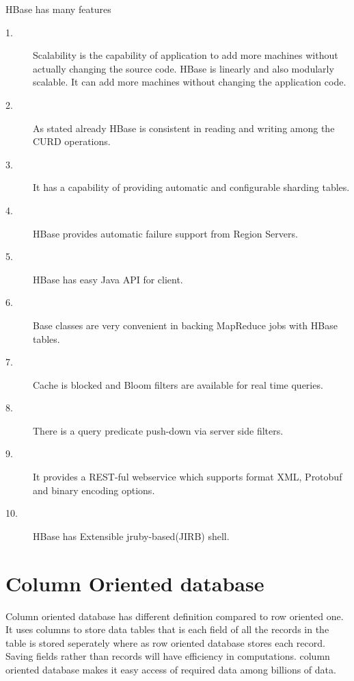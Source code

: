  HBase has many features~\cite{hid-sp18-421-HBase-feature}
 \begin{description}
  \item [1.] Scalability is the capability of application to add more machines 
  without actually changing the source code. HBase is linearly and also 
  modularly scalable. It can add more machines without changing the application 
  code.

 \item [2.] As stated already HBase is consistent in reading and writing among 
 the CURD operations.

 \item [3.] It has a capability of providing automatic and configurable sharding
 tables.

 \item [4.] HBase provides automatic failure support from Region Servers.

 \item [5.] HBase has easy Java API for client.

 \item [6.] Base classes are very convenient in backing MapReduce jobs with 
 HBase tables.

 \item [7.] Cache is blocked and Bloom filters are available for real time 
 queries.

 \item [8.] There is a query predicate push-down via server side filters.

 \item [9.] It provides a REST-ful webservice which supports format XML, 
 Protobuf and binary encoding options.

 \item [10.]HBase has Extensible jruby-based(JIRB) shell.
 \end{description}

\section{Column Oriented database}

Column oriented database has different definition compared to row oriented one. 
It uses columns to store data tables that is each field of all the records in 
the table is stored  seperately where as row oriented database stores each 
record. Saving fields rather than records will have efficiency in computations.
column oriented database makes it easy access of required data among billions of 
data. 

